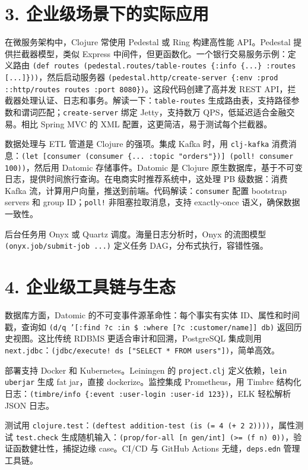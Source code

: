 \chapter{3. 企业级场景下的实际应用}
在微服务架构中，Clojure 常使用 Pedestal 或 Ring 构建高性能 API。Pedestal 提供拦截器模型，类似 Express 中间件，但更函数化。一个银行交易服务示例：定义路由 \texttt{(def routes (pedestal.routes/table-routes \{{}:info \{{}...\}{} :routes [...]\}{}))}，然后启动服务器 \texttt{(pedestal.http/create-server \{{}:env :prod ::http/routes routes :port 8080\}{})}。这段代码创建了高并发 REST API，拦截器处理认证、日志和事务。解读一下：\texttt{table-routes} 生成路由表，支持路径参数和谓词匹配；\texttt{create-server} 绑定 Jetty，支持数万 QPS，低延迟适合金融交易。相比 Spring MVC 的 XML 配置，这更简洁，易于测试每个拦截器。\par
数据处理与 ETL 管道是 Clojure 的强项。集成 Kafka 时，用 \texttt{clj-kafka} 消费消息：\texttt{(let [consumer (consumer \{{}... :topic "orders"\}{})] (poll! consumer 100))}，然后用 Datomic 存储事件。Datomic 是 Clojure 原生数据库，基于不可变日志，提供时间旅行查询。在电商实时推荐系统中，这处理 PB 级数据：消费 Kafka 流，计算用户向量，推送到前端。代码解读：\texttt{consumer} 配置 bootstrap servers 和 group ID；\texttt{poll!} 非阻塞拉取消息，支持 exactly-once 语义，确保数据一致性。\par
后台任务用 Onyx 或 Quartz 调度。海量日志分析时，Onyx 的流图模型 \texttt{(onyx.job/submit-job ...)} 定义任务 DAG，分布式执行，容错性强。\par
\chapter{4. 企业级工具链与生态}
数据库方面，Datomic 的不可变事件源革命性：每个事实有实体 ID、属性和时间戳，查询如 \texttt{(d/q '[:find ?c :in \${} :where [?c :customer/name]] db)} 返回历史视图。这比传统 RDBMS 更适合审计和回溯，PostgreSQL 集成则用 \texttt{next.jdbc}：\texttt{(jdbc/execute! ds ["SELECT * FROM users"])}，简单高效。\par
部署支持 Docker 和 Kubernetes。Leiningen 的 \texttt{project.clj} 定义依赖，\texttt{lein uberjar} 生成 fat jar，直接 dockerize。监控集成 Prometheus，用 Timbre 结构化日志：\texttt{(timbre/info \{{}:event :user-login :user-id 123\}{})}，ELK 轻松解析 JSON 日志。\par
测试用 \texttt{clojure.test}：\texttt{(deftest addition-test (is (= 4 (+ 2 2))))}，属性测试 \texttt{test.check} 生成随机输入：\texttt{(prop/for-all [n gen/int] (>= (f n) 0))}，验证函数健壮性，捕捉边缘 case。CI/CD 与 GitHub Actions 无缝，\texttt{deps.edn} 管理工具链。\par
